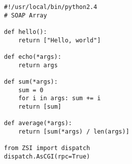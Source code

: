 \begin{verbatim}
#!/usr/local/bin/python2.4
# SOAP Array

def hello():
    return ["Hello, world"]

def echo(*args):
    return args

def sum(*args):
    sum = 0
    for i in args: sum += i
    return [sum]

def average(*args):
    return [sum(*args) / len(args)]

from ZSI import dispatch
dispatch.AsCGI(rpc=True)
\end{verbatim}
